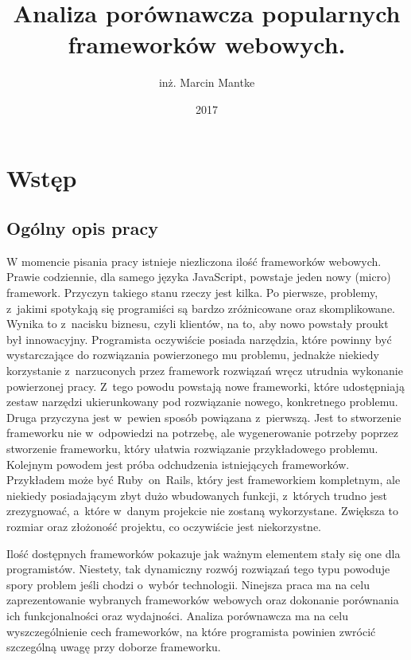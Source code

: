 \documentclass[mgr,oneside]{mgr}
\author{inż. Marcin Mantke}
\title{Analiza porównawcza popularnych frameworków webowych.}
\date{2017}
\renewcommand\lstlistlistingname{Spis listingów}
\begin{document}
\maketitle
\tableofcontents

\listoffigures
\listoftables
\lstlistoflistings
{}
\addcontentsline{toc}{chapter}{\lstlistlistingname}

\chapter{Wstęp}
\section{Ogólny opis pracy}
W momencie pisania pracy istnieje niezliczona ilość frameworków webowych. Prawie codziennie, dla samego języka JavaScript, powstaje jeden nowy (micro) framework. Przyczyn takiego stanu rzeczy jest kilka. Po pierwsze, problemy, z~jakimi spotykają się programiści są bardzo zróżnicowane oraz skomplikowane. Wynika to z~nacisku biznesu, czyli klientów, na to, aby nowo powstały proukt był innowacyjny. Programista oczywiście posiada narzędzia, które powinny być wystarczające do rozwiązania powierzonego mu problemu, jednakże niekiedy korzystanie z~narzuconych przez framework rozwiązań wręcz utrudnia wykonanie powierzonej pracy. Z~tego powodu powstają nowe frameworki, które udostępniają zestaw narzędzi ukierunkowany pod rozwiązanie nowego, konkretnego problemu. Druga przyczyna jest w~pewien sposób powiązana z~pierwszą. Jest to stworzenie frameworku nie w~odpowiedzi na potrzebę, ale wygenerowanie potrzeby poprzez stworzenie frameworku, który ułatwia rozwiązanie przykładowego problemu. Kolejnym powodem jest próba odchudzenia istniejących frameworków. Przykładem może być Ruby~on~Rails, który jest frameworkiem kompletnym, ale niekiedy posiadającym zbyt dużo wbudowanych funkcji, z~których trudno jest zrezygnować, a~które w~danym projekcie nie zostaną wykorzystane. Zwiększa to rozmiar oraz złożoność projektu, co oczywiście jest niekorzystne.

Ilość dostępnych frameworków pokazuje jak ważnym elementem stały się one dla programistów. Niestety, tak dynamiczny rozwój rozwiązań tego typu powoduje spory problem jeśli chodzi o~wybór technologii. Ninejsza praca ma na celu zaprezentowanie wybranych frameworków webowych oraz dokonanie porównania ich funkcjonalności oraz wydajności. Analiza porównawcza ma na celu wyszczególnienie cech frameworków, na które programista powinien zwrócić szczególną uwagę przy doborze frameworku.
\end{document}
